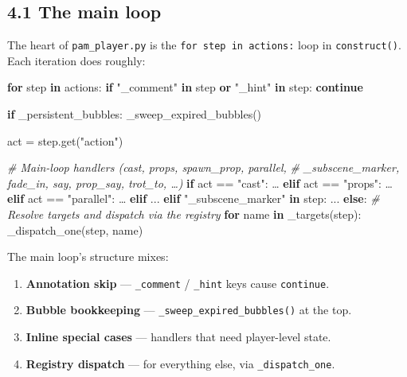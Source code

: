 \documentclass[
  11pt,
]{book}
\newenvironment{Shaded}{}{}
\newcommand{\CommentTok}[1]{\textcolor[rgb]{0.38,0.63,0.69}{\textit{#1}}}
\newcommand{\ControlFlowTok}[1]{\textcolor[rgb]{0.00,0.44,0.13}{\textbf{#1}}}
\newcommand{\KeywordTok}[1]{\textcolor[rgb]{0.00,0.44,0.13}{\textbf{#1}}}
\newcommand{\NormalTok}[1]{#1}
\newcommand{\OperatorTok}[1]{\textcolor[rgb]{0.40,0.40,0.40}{#1}}
\newcommand{\StringTok}[1]{\textcolor[rgb]{0.25,0.44,0.63}{#1}}
\providecommand{\tightlist}{%
  \setlength{\itemsep}{0pt}\setlength{\parskip}{0pt}}
\begin{document}
\subsection{4.1 The main loop}\label{the-main-loop}

The heart of \texttt{pam\_player.py} is the
\texttt{for\ step\ in\ actions:} loop in \texttt{construct()}. Each
iteration does roughly:

\begin{Shaded}
\begin{Highlighting}[]
\ControlFlowTok{for}\NormalTok{ step }\KeywordTok{in}\NormalTok{ actions:}
    \ControlFlowTok{if} \StringTok{"\_comment"} \KeywordTok{in}\NormalTok{ step }\KeywordTok{or} \StringTok{"\_hint"} \KeywordTok{in}\NormalTok{ step:}
        \ControlFlowTok{continue}

    \ControlFlowTok{if}\NormalTok{ \_persistent\_bubbles:}
\NormalTok{        \_sweep\_expired\_bubbles()}

\NormalTok{    act }\OperatorTok{=}\NormalTok{ step.get(}\StringTok{"action"}\NormalTok{)}

    \CommentTok{\# Main{-}loop handlers (cast, props, spawn\_prop, parallel,}
    \CommentTok{\# \_subscene\_marker, fade\_in, say, prop\_say, trot\_to, …)}
    \ControlFlowTok{if}\NormalTok{ act }\OperatorTok{==} \StringTok{"cast"}\NormalTok{: …}
    \ControlFlowTok{elif}\NormalTok{ act }\OperatorTok{==} \StringTok{"props"}\NormalTok{: …}
    \ControlFlowTok{elif}\NormalTok{ act }\OperatorTok{==} \StringTok{"parallel"}\NormalTok{: …}
    \ControlFlowTok{elif}\NormalTok{ ...}
    \ControlFlowTok{elif} \StringTok{"\_subscene\_marker"} \KeywordTok{in}\NormalTok{ step:}
\NormalTok{        ...}
    \ControlFlowTok{else}\NormalTok{:}
        \CommentTok{\# Resolve targets and dispatch via the registry}
        \ControlFlowTok{for}\NormalTok{ name }\KeywordTok{in}\NormalTok{ \_targets(step):}
\NormalTok{            \_dispatch\_one(step, name)}
\end{Highlighting}
\end{Shaded}

The main loop's structure mixes:

\begin{enumerate}
\def\labelenumi{\arabic{enumi}.}
\tightlist
\item
  \textbf{Annotation skip} --- \texttt{\_comment} / \texttt{\_hint} keys
  cause \texttt{continue}.
\item
  \textbf{Bubble bookkeeping} --- \texttt{\_sweep\_expired\_bubbles()}
  at the top.
\item
  \textbf{Inline special cases} --- handlers that need player-level
  state.
\item
  \textbf{Registry dispatch} --- for everything else, via
  \texttt{\_dispatch\_one}.
\end{enumerate}
\end{document}
